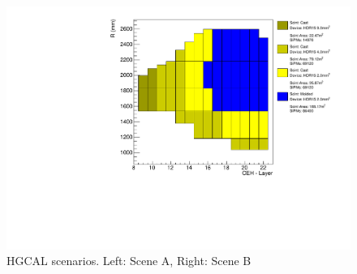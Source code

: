 \begin{figure}[!ht]
\begin{minipage}[c]{0.49\textwidth}
  \end{minipage}
  \begin{minipage}[c]{0.49\textwidth}
    \includegraphics[trim={0 0 165pt 0},clip,width=\textwidth]{figures/hgcal/plot_scenes/sceneB_jan20_fix_vto2p0_with9mm2.pdf}
  \end{minipage}
  \caption[\gls{HGCAL} scenarios]{\gls{HGCAL} scenarios. Left: Scene A, Right: Scene B}%
  \label{fig:hgcal-scenes-fnal-jan20}
\end{figure}

